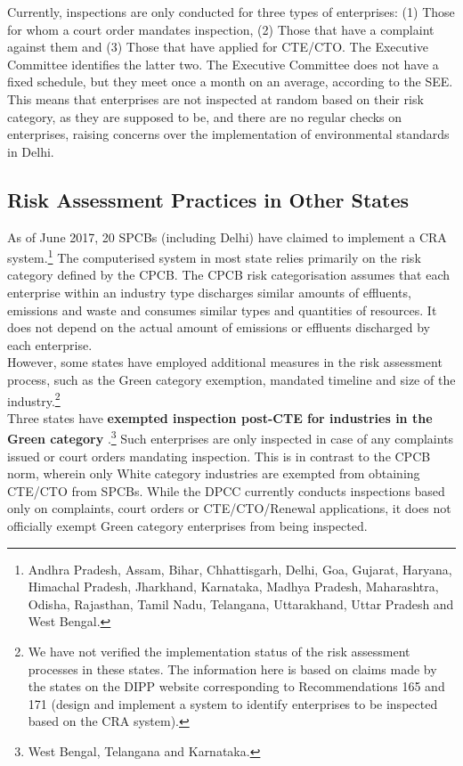 \documentclass[a4paper, 12pt, twoside]{article}
\begin{document}
	Currently, inspections are only conducted for three types of enterprises: (1) Those for whom a court order mandates inspection, (2) Those that have a complaint against them and (3) Those that have applied for CTE/CTO. The Executive Committee identifies the latter two. The Executive Committee does not have a fixed schedule, but they meet once a month on an average, according to the SEE. This means that enterprises are not inspected at random based on their risk category, as they are supposed to be, and there are no regular checks on enterprises, raising concerns over the implementation of environmental standards in Delhi. 
	
	\subsection{Risk Assessment Practices in Other States}
	
	As of June 2017, 20 SPCBs (including Delhi) have claimed to implement a CRA system.\footnote{Andhra Pradesh, Assam, Bihar, Chhattisgarh, Delhi, Goa, Gujarat, Haryana, Himachal Pradesh, Jharkhand, Karnataka, Madhya Pradesh, Maharashtra, Odisha, Rajasthan, Tamil Nadu, Telangana, Uttarakhand, Uttar Pradesh and West Bengal.} The computerised system in most state relies primarily on the risk category defined by the CPCB. The CPCB risk categorisation assumes that each enterprise within an industry type discharges similar amounts of effluents, emissions and waste and consumes similar types and quantities of resources. It does not depend on the actual amount of emissions or effluents discharged by each enterprise. \\
	
	However, some states have employed additional measures in the risk assessment process, such as the Green category exemption, mandated timeline and size of the industry.\footnote{We have not verified the implementation status of the risk assessment processes in these states. The information here is based on claims made by the states on the DIPP website corresponding to Recommendations 165 and 171 (design and implement a system to identify enterprises to be inspected based on the CRA system).} \\
	
	Three states have \textbf{exempted inspection post-CTE for industries in the Green category} \parencite{DIPPd}.\footnote{West Bengal, Telangana and Karnataka.} Such enterprises are only inspected in case of any complaints issued or court orders mandating inspection. This is in contrast to the CPCB norm, wherein only White category industries are exempted from obtaining CTE/CTO from SPCBs. While the DPCC currently conducts inspections based only on complaints, court orders or CTE/CTO/Renewal applications, it does not officially exempt Green category enterprises from being inspected. \\
	
\end{document}
